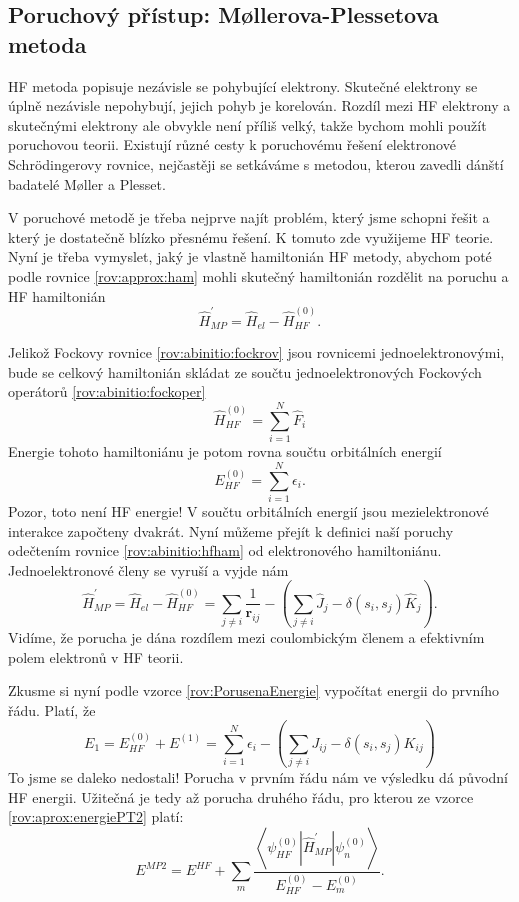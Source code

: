 \subsection{Poruchový přístup: M\o llerova-Plessetova metoda}
HF metoda popisuje nezávisle se pohybující elektrony. Skutečné elektrony se úplně nezávisle nepohybují, jejich pohyb je korelován. Rozdíl mezi HF elektrony a skutečnými elektrony ale obvykle není příliš velký, takže bychom mohli použít poruchovou teorii.  Existují různé cesty k poruchovému řešení elektronové Schr\"{o}dingerovy rovnice, nejčastěji se setkáváme s metodou, kterou zavedli dánští badatelé M\o ller a Plesset.

V poruchové metodě je třeba nejprve najít problém, který jsme schopni řešit a který je dostatečně blízko přesnému řešení. K tomuto zde využijeme HF teorie. Nyní je třeba vymyslet, jaký je vlastně hamiltonián HF metody, abychom poté podle rovnice \eqref{rov:approx:ham} mohli skutečný hamiltonián rozdělit na poruchu a HF hamiltonián
\begin{equation}
\hat{H}^{\prime}_{MP}=\hat{H}_{el} - \hat{H}^{(0)}_{HF} .
\end{equation}

Jelikož Fockovy rovnice \ref{rov:abinitio:fockrov} jsou rovnicemi jednoelektronovými, bude se celkový hamiltonián skládat ze součtu jednoelektronových Fockových operátorů \ref{rov:abinitio:fockoper}
\begin{equation}
\hat{H}^{(0)}_{HF}= \sum_{i=1}^N \hat{F}_i
\label{rov:abinitio:hfham}
\end{equation}
Energie tohoto hamiltoniánu je potom rovna součtu orbitálních energií
\begin{equation}
E^{(0)}_{HF}=\sum_{i=1}^N \epsilon_i .
\end{equation}
Pozor, toto není HF energie! V součtu orbitálních energií jsou mezielektronové interakce započteny dvakrát. Nyní můžeme přejít k definici naší poruchy odečtením rovnice \eqref{rov:abinitio:hfham} od elektronového hamiltoniánu. Jednoelektronové členy se vyruší a vyjde nám
\begin{equation}
\hat{H}^{\prime}_{MP}=\hat{H}_{el}-\hat{H}^{(0)}_{HF}= \sum_{j\neq i} \frac{1}{\textbf{r}_{ij}} - \left(\sum_{j\neq i} \hat{J}_j - \delta(s_i,s_j) \hat{K}_j \right) .
\end{equation}
Vidíme, že porucha je dána rozdílem mezi coulombickým členem a efektivním polem elektronů v HF teorii.

Zkusme si nyní podle vzorce \eqref{rov:PorusenaEnergie} vypočítat energii do prvního řádu. Platí, že
\begin{equation}
E_1=E^{(0)}_{HF} + E^{(1)}= \sum_{i=1}^N \epsilon_i - \left(\sum_{j\neq i} J_{ij} - \delta(s_i,s_j) {K}_{ij} \right)
\end{equation}
To jsme se daleko nedostali! Porucha v prvním řádu nám ve výsledku dá původní HF energii.
Užitečná je tedy až porucha druhého řádu, pro kterou ze vzorce \eqref{rov:aprox:energiePT2} platí:
\begin{equation}
E^{MP2} = E^{HF} + \sum_m \frac{\left < \psi^{(0)}_{HF}|\hat{H}^{\prime}_{MP}|\psi_n^{(0)} \right >}{E_{HF}^{(0)}-E_m^{(0)}}.
\end{equation}

